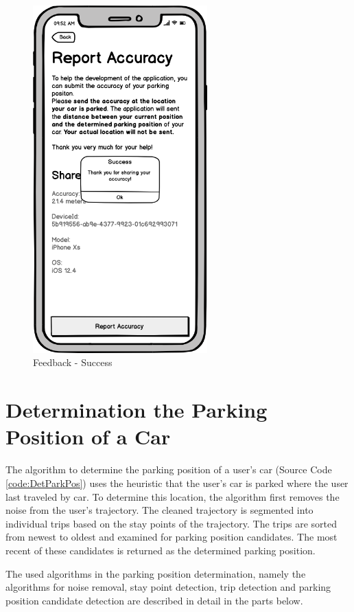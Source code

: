 \begin{figure}[h!]
\begin{minipage}[b]{0.49\textwidth}
    \includegraphics[width=0.6\textwidth]{images/UI/Iteration4-Feedback-Success.png}
    \caption{Feedback - Success}
    \label{fig:feedback-succ}
  \end{minipage}
\end{figure}

\section{Determination the Parking Position of a Car}
The algorithm to determine the parking position of a user's car (Source Code \ref{code:DetParkPos}) uses the heuristic that the user's car is parked where the user last traveled by car. To determine this location, the algorithm first removes the noise from the user's trajectory. The cleaned trajectory is segmented into individual trips based on the stay points of the trajectory. The trips are sorted from newest to oldest and examined for parking position candidates. The most recent of these candidates is returned as the determined parking position.


The used algorithms in the parking position determination, namely the algorithms for noise removal, stay point detection, trip detection and parking position candidate detection are described in detail in the parts below.


